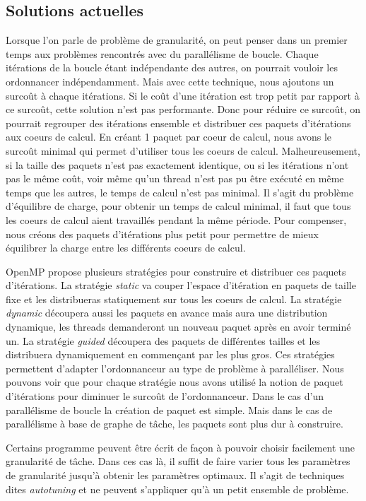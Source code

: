 \subsection{Solutions actuelles}
Lorsque l'on parle de problème de granularité, on peut penser dans un premier temps aux problèmes rencontrés avec du parallélisme de boucle.
%
Chaque itérations de la boucle étant indépendante des autres, on pourrait vouloir les ordonnancer indépendamment.
%
Mais avec cette technique, nous ajoutons un surcoût à chaque itérations.
%
Si le coût d'une itération est trop petit par rapport à ce surcoût, cette solution n'est pas performante.
%
Donc pour réduire ce surcoût, on pourrait regrouper des itérations ensemble et distribuer ces paquets d'itérations aux coeurs de calcul.
%
En créant 1 paquet par coeur de calcul, nous avons le surcoût minimal qui permet d'utiliser tous les coeurs de calcul.
%
Malheureusement, si la taille des paquets n'est pas exactement identique, ou si les itérations n'ont pas le même coût, voir même qu'un thread n'est pas pu être exécuté en même temps que les autres, le temps de calcul n'est pas minimal.
%
Il s'agit du problème d'équilibre de charge, pour obtenir un temps de calcul minimal, il faut que tous les coeurs de calcul aient travaillés pendant la même période.
%
Pour compenser, nous créons des paquets d'itérations plus petit pour permettre de mieux équilibrer la charge entre les différents coeurs de calcul.


OpenMP propose plusieurs stratégies pour construire et distribuer ces paquets d'itérations.
%
La stratégie {\em static} va couper l'espace d'itération en paquets de taille fixe et les distribueras statiquement sur tous les coeurs de calcul.
%
La stratégie {\em dynamic} découpera aussi les paquets en avance mais aura une distribution dynamique, les threads demanderont un nouveau paquet après en avoir terminé un.
%
La stratégie {\em guided} découpera des paquets de différentes tailles et les distribuera dynamiquement en commençant par les plus gros.
%
Ces stratégies permettent d'adapter l'ordonnanceur au type de problème à paralléliser.
%
Nous pouvons voir que pour chaque stratégie nous avons utilisé la notion de paquet d'itérations pour diminuer le surcoût de l'ordonnanceur.
%
Dans le cas d'un parallélisme de boucle la création de paquet est simple.
%
Mais dans le cas de parallélisme à base de graphe de tâche, les paquets sont plus dur à construire.



Certains programme peuvent être écrit de façon à pouvoir choisir facilement une granularité de tâche.
%
Dans ces cas là, il suffit de faire varier tous les paramètres de granularité jusqu'à obtenir les paramètres optimaux.
%
Il s'agit de techniques dites {\em autotuning} et ne peuvent s'appliquer qu'à un petit ensemble de problème.



